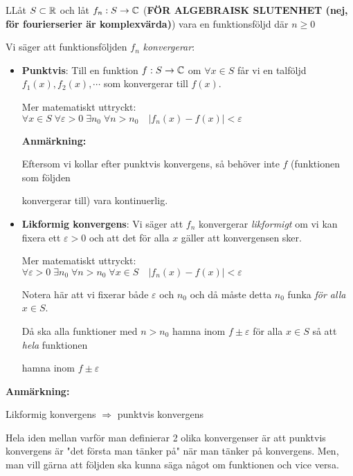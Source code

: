 \begin{theo}
  LLåt $S\subset\mathbb{R}$ och låt $f_n:S\to\mathbb{C}$ (\textbf{FÖR ALGEBRAISK SLUTENHET (nej, för fourierserier är komplexvärda)}) vara en funktionsföljd där $n\geq0$
  \par\bigskip
  \noindent Vi säger att funktionsföljden $f_n$ \textit{konvergerar}:\par
  \begin{itemize}
    \item \textbf{Punktvis}: Till en funktion $f:S\to\mathbb{C}$ om $\forall x\in S$ får vi en talföljd $f_1(x),f_2(x),\cdots$ som konvergerar till $f(x)$. 
      \par\bigskip
      Mer matematiskt uttryckt: $\forall x\in S\;\forall\varepsilon>0\;\exists n_0\;\forall n>n_0\quad \left|f_n(x)-f(x)\right|<\varepsilon$
      \par\bigskip
      \textbf{Anmärkning:}\par
      Eftersom vi kollar efter punktvis konvergens, så behöver inte $f$ (funktionen som följden\par konvergerar till) vara kontinuerlig. 
      \par\bigskip

    \item\textbf{Likformig konvergens}: Vi säger att $f_n$ konvergerar \textit{likformigt} om vi kan fixera ett $\varepsilon>0$ och att det för alla $x$ gäller att konvergensen sker.
      \par\bigskip
      Mer matematiskt uttryckt: $\forall \varepsilon>0\;\exists n_0\;\forall n>n_0\;\forall x\in S\quad \left|f_n(x)-f(x)\right|<\varepsilon$
      \par\bigskip
      Notera här att vi fixerar både $\varepsilon$ och $n_0$ och då måste detta $n_0$ funka \textit{för alla} $x\in S$.\par
      Då ska alla funktioner med $n>n_0$ hamna inom $f\pm \varepsilon$ för alla $x\in S$ så att \textit{hela} funktionen\par hamna inom $f\pm\varepsilon$ 
  \end{itemize}
\end{theo}
\par\bigskip
\noindent\textbf{Anmärkning:}\par
\noindent Likformig konvergens $\Rightarrow$ punktvis konvergens
\par\bigskip
\noindent Hela iden mellan varför man definierar 2 olika konvergenser är att punktvis konvergens är "det första man tänker på" när man tänker på konvergens. Men, man vill gärna att följden ska kunna säga något om funktionen och vice versa.
